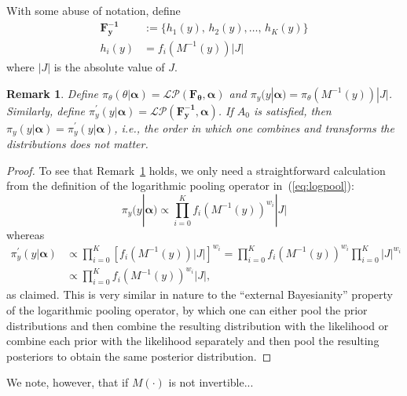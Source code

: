 \documentclass[a4paper, notitlepage, 10pt]{article}
\newtheorem{remark}{Remark}[]
\begin{document}
{With some abuse of notation, define
  \begin{align}
  \label{eq:transfF}
  \mathbf{F^{-1}_y} &:= \{h_1(y), \, h_2(y), \ldots, \, h_K(y) \} \\
  h_i(y) & = f_i(M^{-1}(y))|J|\nonumber
  \end{align}
where $|J|$ is the absolute value of $J$.
\begin{remark}
\label{rmk:invariance}
Define $\pi_{\theta}(\theta | \boldsymbol\alpha) =  \mathcal{LP}(\mathbf{F_\theta}, \boldsymbol\alpha)$ and $\pi_{y}(y |\boldsymbol\alpha) = \pi_{\theta}(M^{-1}(y))|J|$.
Similarly, define $\pi^{\prime}_{y}(y|\boldsymbol\alpha) = \mathcal{LP}(\mathbf{F^{-1}_y}, \boldsymbol\alpha)$.
If $A_0$ is satisfied, then $\pi_{y}(y |\boldsymbol\alpha) = \pi^{\prime}_{y}(y|\boldsymbol\alpha)$, i.e., the order in which one combines and transforms the distributions does not matter.
\end{remark}
\begin{proof}
To see that Remark~\ref{rmk:invariance} holds, we only need a straightforward calculation from the definition of the logarithmic pooling operator in~(\ref{eq:logpool}):
\[\pi_{y}(y |\boldsymbol\alpha) \propto \prod_{i=0}^K f_i(M^{-1}(y))^{w_i}|J| \]
whereas
\begin{align*}
 \pi^{\prime}_{y}(y|\boldsymbol\alpha) &\propto  \prod_{i=0}^K \left[ f_i(M^{-1}(y))|J| \right] ^{w_i} = \prod_{i=0}^K f_i(M^{-1}(y))^{w_i} \prod_{i=0}^K|J|^{w_i}\\
 &\propto  \prod_{i=0}^K f_i(M^{-1}(y))^{w_i}|J|, %
\end{align*}
as claimed.
This is very similar in nature to the ``external Bayesianity'' property of the logarithmic pooling operator, by which one can either pool the prior distributions and then combine the resulting distribution with the likelihood or combine each prior with the likelihood separately and then pool the resulting posteriors to obtain the same posterior distribution.
\end{proof}

We note, however, that if $M(\cdot)$ is not invertible...

}
\end{document}
